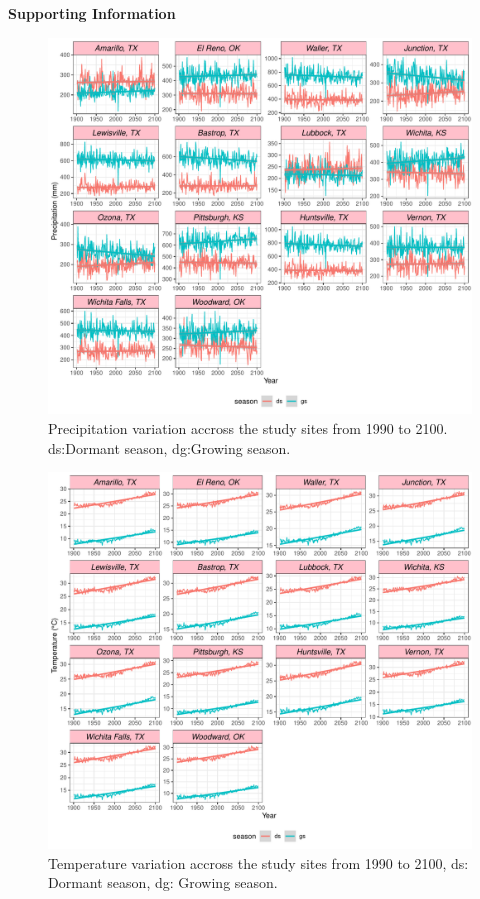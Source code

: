 \documentclass[12pt]{article}\usepackage[]{graphicx}\usepackage[dvipsnames]{xcolor}
\begin{document}
\centerline{\Large{\textbf{Supporting Information}}}


\begin{figure}[H]
		\centering
		\includegraphics[width=0.95\linewidth]{Figures/fig_pr_past_present_future.pdf}
		\caption{Precipitation variation accross the study sites from 1990 to 2100.
		ds:Dormant season, dg:Growing season.}
		\label{Sup:pr_variation}
\end{figure}


\begin{figure}[H]
		\centering
		\includegraphics[width=0.95\linewidth]{Figures/fig_tas_past_present_future.pdf}
		\caption{Temperature variation accross the study sites from 1990 to 2100,
		ds: Dormant season, dg: Growing season.}
		\label{Sup:temp_variation}
\end{figure}
\end{document}
